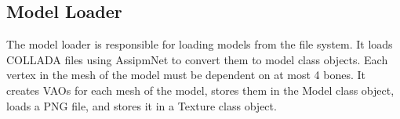 \subsection{Model Loader}

The model loader is responsible for loading models from the file system.
It loads COLLADA files using AssipmNet to convert them to model class objects.
Each vertex in the mesh of the model must be dependent on at most 4 bones.
It creates VAOs for each mesh of the model, stores them in the Model class object, loads a PNG file, and stores it in a Texture class object.
